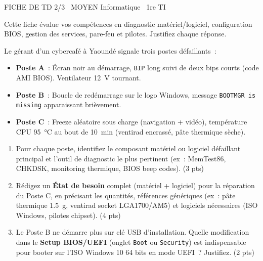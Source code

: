\documentclass[11pt]{article}
\begin{document}
\begin{tcolorbox}[enhanced,colback=popink,colframe=popink,arc=10pt,boxrule=0pt,left=12pt,right=12pt,top=9pt,bottom=9pt]
{\color{white}\popxbold\small FICHE DE TD 2/3 \textbullet\ MOYEN \hfill Informatique \textbullet\ 1re TI\par}
\end{tcolorbox}
\vspace{4pt}
\noindent Cette fiche évalue vos compétences en diagnostic matériel/logiciel, configuration BIOS, gestion des services, pare-feu et pilotes. Justifiez chaque réponse.

\begin{exercice}
Le gérant d'un cybercafé à Yaoundé signale trois postes défaillants~:
\begin{itemize}
    \item \textbf{Poste A}~: Écran noir au démarrage, \texttt{BIP} long suivi de deux bips courts (code AMI BIOS). Ventilateur \SI{12}{V} tournant.
    \item \textbf{Poste B}~: Boucle de redémarrage sur le logo Windows, message \texttt{BOOTMGR is missing} apparaissant brièvement.
    \item \textbf{Poste C}~: Freeze aléatoire sous charge (navigation + vidéo), température CPU \SI{95}{\celsius} au bout de \SI{10}{min} (ventirad encrassé, pâte thermique sèche).
\end{itemize}
\begin{enumerate}
    \item Pour chaque poste, identifiez le composant matériel ou logiciel défaillant principal et l'outil de diagnostic le plus pertinent (ex~: MemTest86, CHKDSK, monitoring thermique, BIOS beep codes). (3 pts)
    \item Rédigez un \textbf{État de besoin} complet (matériel + logiciel) pour la réparation du Poste C, en précisant les quantités, références génériques (ex~: pâte thermique \SI{1.5}{g}, ventirad socket LGA1700/AM5) et logiciels nécessaires (ISO Windows, pilotes chipset). (4 pts)
    \item Le Poste B ne démarre plus sur clé USB d'installation. Quelle modification dans le \textbf{Setup BIOS/UEFI} (onglet \texttt{Boot} ou \texttt{Security}) est indispensable pour booter sur l'ISO Windows 10 64 bits en mode UEFI~? Justifiez. (2 pts)
\end{enumerate}
\end{exercice}
\end{document}

